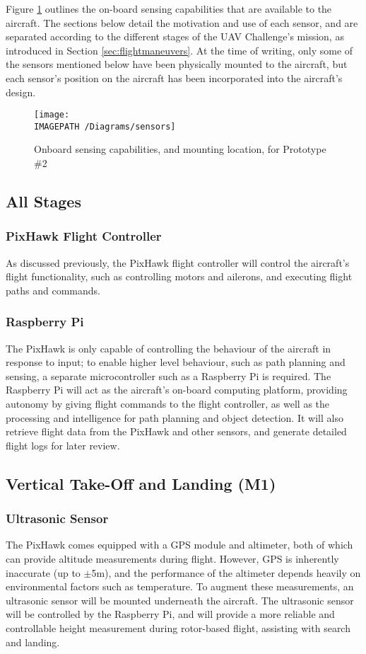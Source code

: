 \label{sec:sensing}
Figure \ref{fig:sensing} outlines the on-board sensing capabilities that are available to the aircraft. The sections below detail the motivation and use of each sensor, and are separated according to the different stages of the UAV Challenge's mission, as introduced in Section \ref{sec:flightmaneuvers}. At the time of writing, only some of the sensors mentioned below have been physically mounted to the aircraft, but each sensor's position on the aircraft has been incorporated into the aircraft's design.

\begin{figure}[!ht]
	\centering
	\texttt{[image: \\IMAGEPATH /Diagrams/sensors]}
	\caption{Onboard sensing capabilities, and mounting location, for Prototype \#2}
	\label{fig:sensing}
\end{figure}

\subsection{All Stages}

\subsubsection*{PixHawk Flight Controller}
As discussed previously, the PixHawk flight controller will control the aircraft's flight functionality, such as controlling motors and ailerons, and executing flight paths and commands.

\subsubsection*{Raspberry Pi}
The PixHawk is only capable of controlling the behaviour of the aircraft in response to input; to enable higher level behaviour, such as path planning and sensing, a separate microcontroller such as a Raspberry Pi is required. The Raspberry Pi will act as the aircraft's on-board computing platform, providing autonomy by giving flight commands to the flight controller, as well as the processing and intelligence for path planning and object detection. It will also retrieve flight data from the PixHawk and other sensors, and generate detailed flight logs for later review.

\subsection{Vertical Take-Off and Landing (M1)}
\subsubsection*{Ultrasonic Sensor}
The PixHawk comes equipped with a GPS module and altimeter, both of which can provide altitude measurements during flight. However, GPS is inherently inaccurate (up to $\pm$5m), and the performance of the altimeter depends heavily on environmental factors such as temperature. To augment these measurements, an ultrasonic sensor will be mounted underneath the aircraft. The ultrasonic sensor will be controlled by the Raspberry Pi, and will provide a more reliable and controllable height measurement during rotor-based flight, assisting with search and landing.

